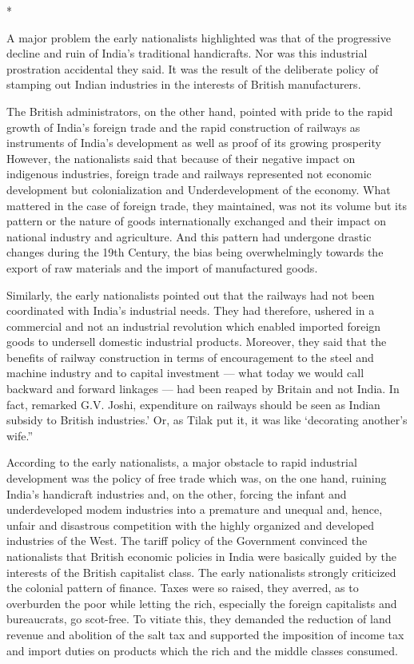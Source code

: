 \begin{center}*\end{center}



A major problem the early nationalists highlighted was that of the progressive decline and ruin of India’s traditional handicrafts. Nor was this industrial prostration accidental they said. It was the result of the deliberate policy of stamping out Indian industries in the interests of British manufacturers.

The British administrators, on the other hand, pointed with pride to the rapid growth of India’s foreign trade and the rapid construction of railways as instruments of India’s development as well as proof of its growing prosperity However, the nationalists said that because of their negative impact on indigenous industries, foreign trade and railways represented not economic development but colonialization and Underdevelopment of the economy. What mattered in the case of foreign trade, they maintained, was not its volume but its pattern or the nature of goods internationally exchanged and their impact on national industry and agriculture. And this pattern had undergone drastic changes during the 19th Century, the bias being overwhelmingly towards the export of raw materials and the import of manufactured goods.

Similarly, the early nationalists pointed out that the railways had not been coordinated with India’s industrial needs. They had therefore, ushered in a commercial and not an industrial revolution which enabled imported foreign goods to undersell domestic industrial products. Moreover, they said that the benefits of railway construction in terms of encouragement to the steel and machine industry and to capital investment — what today we would call backward and forward linkages — had been reaped by Britain and not India. In fact, remarked G.V. Joshi, expenditure on railways should be seen as Indian subsidy to British industries.’ Or, as Tilak put it, it was like ‘decorating another’s wife.”

According to the early nationalists, a major obstacle to rapid industrial development was the policy of free trade which was, on the one hand, ruining India’s handicraft industries and, on the other, forcing the infant and underdeveloped modem industries into a premature and unequal and, hence, unfair and disastrous competition with the highly organized and developed industries of the West. The tariff policy of the Government convinced the nationalists that British economic policies in India were basically guided by the interests of the British capitalist class. The early nationalists strongly criticized the colonial pattern of finance. Taxes were so raised, they averred, as to overburden the poor while letting the rich, especially the foreign capitalists and bureaucrats, go scot-free. To vitiate this, they demanded the reduction of land revenue and abolition of the salt tax and supported the imposition of income tax and import duties on products which the rich and the middle classes consumed.

